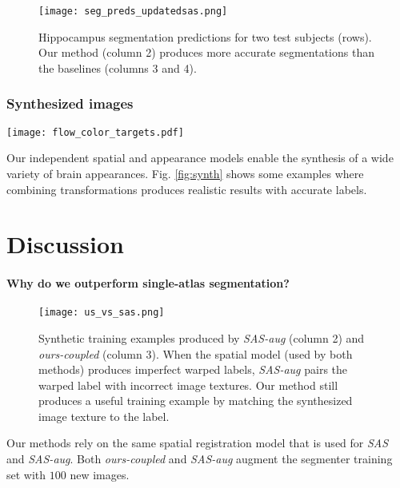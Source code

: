 \documentclass[10pt,twocolumn,letterpaper]{article}
\begin{document}
\begin{figure}
    \centering
    \texttt{[image: seg\_preds\_updatedsas.png]}
        \vspace{-5pt}
    \caption{Hippocampus segmentation predictions for two test subjects (rows). Our method (column 2) produces more accurate segmentations than the baselines (columns 3 and 4).}\label{fig:seg_preds}
\end{figure}

\subsubsection{Synthesized images}
\begin{figure*}[t]
    \centering
        \texttt{[image: flow\_color\_targets.pdf]}
    \caption{Since we model spatial and appearance transformations independently, we are able to synthesize a variety of combined effects. We show some examples synthesized using transformations learned from the training set; these transformations form the bases of our augmentation model. The top row shows a synthetic image where the appearance transformation produced a darkening effect, and the spatial transformation shrunk the ventricles and widened the whole brain. In the second row, the atlas is brightened and the ventricles are enlarged.}\label{fig:synth}
\end{figure*}



Our independent spatial and appearance models enable the synthesis of a wide variety of brain appearances. Fig. \ref{fig:synth} shows some examples where combining transformations produces realistic results with accurate labels. 




 \section{Discussion}\label{sec:discussion}
\vspace{-2pt}
\paragraph{Why do we outperform single-atlas segmentation?}
\begin{figure}[t]
\centering
\texttt{[image: us\_vs\_sas.png]}
\caption{Synthetic training examples produced by \textit{SAS-aug} (column 2) and \textit{ours-coupled} (column 3). When the spatial model (used by both methods) produces imperfect warped labels, \textit{SAS-aug} pairs the warped label with incorrect image textures. Our method still produces a useful training example by matching the synthesized image texture to the label.}
\label{fig:us_vs_sasaug}
\end{figure}
Our methods rely on the same spatial registration model that is used for \textit{SAS} and \textit{SAS-aug}. Both \textit{ours-coupled} and \textit{SAS-aug} augment the segmenter training set with $100$ new images. 
\end{document}
